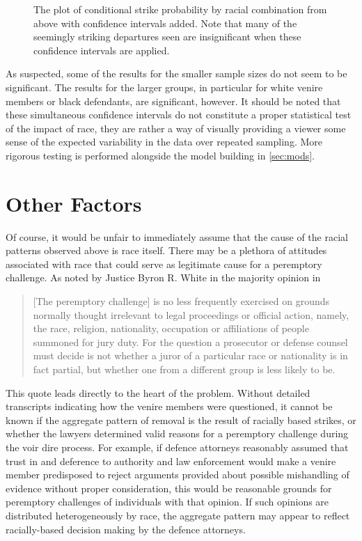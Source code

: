 \begin{figure}[!h]
  \centering
  \caption[Racial Combination and Strikes with Confidence Intervals]{The plot of conditional strike probability by racial
    combination from above with confidence intervals added. Note that many of the seemingly striking departures seen are
    insignificant when these confidence intervals are applied.}
  \label{fig:racedefci}
\end{figure}

As suspected, some of the results for the smaller sample sizes do not seem to be significant. The results for the larger groups,
in particular for white venire members or black defendants, are significant, however. It should be noted that these simultaneous
confidence intervals do not constitute a proper statistical test of the impact of race, they are rather a way of visually
providing a viewer some sense of the expected variability in the data over repeated sampling. More rigorous testing is performed
alongside the model building in \ref{sec:mods}.

\section{Other Factors} \label{sec:otherfact}

Of course, it would be unfair to immediately assume that the cause of the racial patterns observed above is race itself. There
may be a plethora of attitudes associated with race that could serve as legitimate cause for a peremptory challenge. As noted by 
Justice Byron R. White in the majority opinion in \cite{swainvalabama}

\begin{quote}
  [The peremptory challenge] is no less frequently exercised on grounds normally thought irrelevant to legal proceedings or
  official action, namely, the race, religion, nationality, occupation or affiliations of people summoned for jury duty. For the
  question a prosecutor or defense counsel must decide is not whether a juror of a particular race or nationality is in fact
  partial, but whether one from a different group is less likely to be.
\end{quote}

This quote leads directly to the heart of the problem. Without detailed transcripts indicating how the venire members were
questioned, it cannot be known if the aggregate pattern of removal is the result of racially based strikes, or whether the lawyers
determined valid reasons for a peremptory challenge during the voir dire process. For example, if defence attorneys reasonably
assumed that trust in and deference to authority and law enforcement would make a venire member predisposed to reject arguments
provided about possible mishandling of evidence without proper consideration, this would be reasonable grounds for peremptory
challenges of individuals with that opinion. If such opinions are distributed heterogeneously by race, the aggregate pattern may
appear to reflect racially-based decision making by the defence attorneys. 

